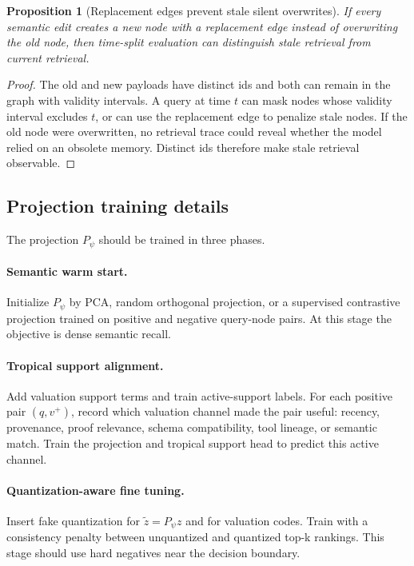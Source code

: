 \documentclass[11pt]{article}
\newtheorem{proposition}[theorem]{Proposition}
\theoremstyle{definition}
\theoremstyle{remark}
\begin{document}
\begin{proposition}[Replacement edges prevent stale silent overwrites]
If every semantic edit creates a new node with a replacement edge instead of overwriting the old node, then time-split evaluation can distinguish stale retrieval from current retrieval.
\end{proposition}
\begin{proof}
The old and new payloads have distinct ids and both can remain in the graph with validity intervals. A query at time \(t\) can mask nodes whose validity interval excludes \(t\), or can use the replacement edge to penalize stale nodes. If the old node were overwritten, no retrieval trace could reveal whether the model relied on an obsolete memory. Distinct ids therefore make stale retrieval observable.
\end{proof}

\subsection{Projection training details}

The projection \(P_\psi\) should be trained in three phases.

\paragraph{Semantic warm start.} Initialize \(P_\psi\) by PCA, random orthogonal projection, or a supervised contrastive projection trained on positive and negative query-node pairs. At this stage the objective is dense semantic recall.

\paragraph{Tropical support alignment.} Add valuation support terms and train active-support labels. For each positive pair \((q,v^+)\), record which valuation channel made the pair useful: recency, provenance, proof relevance, schema compatibility, tool lineage, or semantic match. Train the projection and tropical support head to predict this active channel.

\paragraph{Quantization-aware fine tuning.} Insert fake quantization for \(\tilde z=P_\psi z\) and for valuation codes. Train with a consistency penalty between unquantized and quantized top-k rankings. This stage should use hard negatives near the decision boundary.
\end{document}
